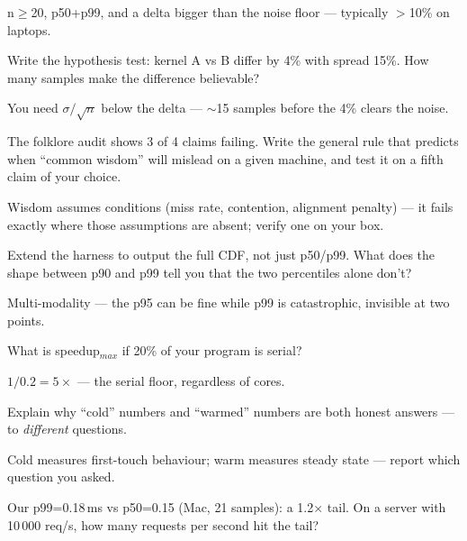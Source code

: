 \begin{solution}[hint]
n$\geq$20, p50+p99, and a delta bigger than the noise floor ---
typically $>$10\% on laptops.
\end{solution}
\begin{exercise}[medium]
Write the hypothesis test: kernel A vs B differ by 4\% with
spread 15\%. How many samples make the difference believable?
\end{exercise}
\begin{solution}[hint]
You need $\sigma/\sqrt{n}$ below the delta --- $\sim$15 samples
before the 4\% clears the noise.
\end{solution}
\begin{exercise}[hard]
The folklore audit shows 3 of 4 claims failing. Write the general
rule that predicts when ``common wisdom'' will mislead on a given
machine, and test it on a fifth claim of your choice.
\end{exercise}
\begin{solution}[hint]
Wisdom assumes conditions (miss rate, contention, alignment
penalty) --- it fails exactly where those assumptions are absent;
verify one on your box.
\end{solution}
\begin{exercise}[hard]
Extend the harness to output the full CDF, not just p50/p99. What
does the shape between p90 and p99 tell you that the two
percentiles alone don't?
\end{exercise}
\begin{solution}[hint]
Multi-modality --- the p95 can be fine while p99 is catastrophic,
invisible at two points.
\end{solution}
\begin{exercise}[easy]
What is speedup$_{max}$ if 20\% of your program is serial?
\end{exercise}
\begin{solution}[hint]
$1/0.2=5\times$ --- the serial floor, regardless of cores.
\end{solution}
\begin{exercise}[medium]
Explain why ``cold'' numbers and ``warmed'' numbers are both
honest answers --- to \emph{different} questions.
\end{exercise}
\begin{solution}[hint]
Cold measures first-touch behaviour; warm measures steady state
--- report which question you asked.
\end{solution}
\begin{exercise}[medium]
Our p99=0.18\,ms vs p50=0.15 (Mac, 21 samples): a 1.2$\times$ tail. On a server with
10\,000 req/s, how many requests per second hit the tail?
\end{exercise}
